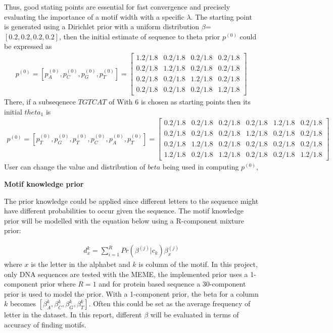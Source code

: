 \documentclass{article}
\begin{document}
Thus, good stating points are essential for fast convergence and precisely evaluating the importance of a motif width with a specific $\lambda$. The starting point is generated using a Dirichlet prior with a uniform distribution
$\beta$=$[0.2,0.2,0.2,0.2]$, then the initial estimate of sequence to theta prior $p^{(0)}$ could be expressed as 
\begin{align*}
p^{(0)} = [p_{A}^{(0)},p_{C}^{(0)},p_{G}^{(0)},p_{T}^{(0)}]=\begin{bmatrix}
1.2/1.8 & 0.2/1.8 & 0.2/1.8&0.2/1.8 \\
0.2/1.8& 1.2/1.8&0.2/1.8&0.2/1.8\\
0.2/1.8& 0.2/1.8&1.2/1.8&0.2/1.8 \\
0.2/1.8 &0.2/1.8& 0.2/1.8&1.2/1.8
\end{bmatrix}
\end{align*}
There, if a subseqenece $TGTCAT$ of With 6 is chosen as starting points then its initial $theta_1$ is
\begin{align*}
p^{(0)} = [p_{T}^{(0)},p_{G}^{(0)},p_{T}^{(0)},p_{C}^{(0)},p_{A}^{(0)},p_{T}^{(0)}]=\begin{bmatrix}
0.2/1.8 & 0.2/1.8 & 0.2/1.8&0.2/1.8 &1.2/1.8 &0.2/1.8\\
0.2/1.8& 0.2/1.8&0.2/1.8&1.2/1.8 & 0.2/1.8&0.2/1.8\\
0.2/1.8& 1.2/1.8&0.2/1.8&0.2/1.8  &0.2/1.8 &0.2/1.8\\
1.2/1.8 &0.2/1.8& 1.2/1.8&0.2/1.8 &0.2/1.8 &1.2/1.8
\end{bmatrix}
\end{align*}
User can change the value and distribution of $beta$ being used in computing  $p^{(0)}$,

\textbf{Motif knowledge prior}

The prior knowledge could be applied since different letters to the sequence might have different probabilities to occur given the sequence. The motif knowledge prior will be modelled with the equation below using a R-component mixture prior:

\begin{align}
     d_x^k= \sum_{i=1}^{R}Pr(\beta^{(j)}|c_k)\beta_{x}^{(j)}
\end{align}
where $x$ is the letter in the alphabet and $k$ is column of the motif. In this project, only DNA sequences are tested with the MEME, the implemented prior uses a 1-component prior where $R=1$ and for protein based sequence a 30-component prior is used to model the prior. With a 1-component prior, the beta for a column $k$ becomes $[\beta_A^k,\beta_C^k,\beta_G^k,\beta_T^k]$. Often this could be set as the average frequency of letter in the dataset. In this report, different $\beta$ will be evaluated in terms of accuracy of finding motifs.
\end{document}
